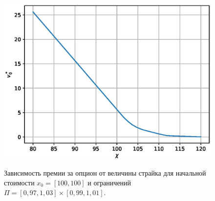 \documentclass[a4paper, 12pt]{article}
\theoremstyle{def}
\theoremstyle{th}
\theoremstyle{rem}
\begin{document}
    \begin{figure}[h]
        \noindent
        \centering
        {
                \includegraphics[width=120mm]{depends_on_strike.eps}
        }
        \caption{Зависимость премии за опцион от величины страйка для начальной стоимости $x_0=[100,100]$ и ограничений $\Pi=[0,\!97,1,\!03]\times[0,\!99,1,\!01]$.}
    \end{figure}
\end{document}
